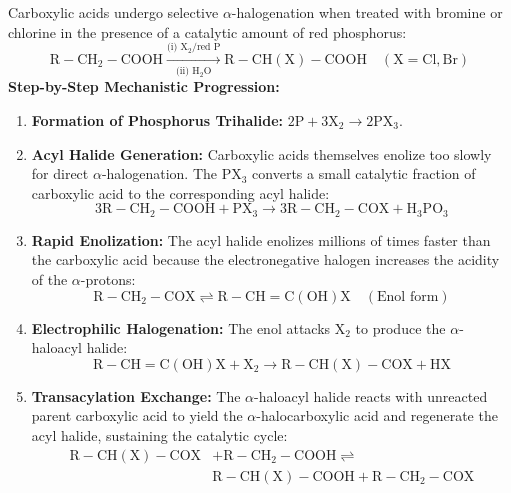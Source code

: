 \documentclass[10pt,twoside,openright]{book}
\begin{document}
\begin{conceptbox}
Carboxylic acids undergo selective $\alpha$-halogenation when treated with bromine or chlorine in the presence of a catalytic amount of red phosphorus:
\begin{equation}
  \mathrm{R-CH_2-COOH} \xrightarrow[\text{(ii) } \mathrm{H_2O}]{\text{(i) } \mathrm{X_2} / \text{red P}} \mathrm{R-CH(X)-COOH} \quad (\mathrm{X = Cl, Br})
\end{equation}
\textbf{Step-by-Step Mechanistic Progression:}
\begin{enumerate}[leftmargin=*]
  \item \textbf{Formation of Phosphorus Trihalide:} $2\mathrm{P} + 3\mathrm{X_2} \to 2\mathrm{PX_3}$.
  \item \textbf{Acyl Halide Generation:} Carboxylic acids themselves enolize too slowly for direct $\alpha$-halogenation. The $\mathrm{PX_3}$ converts a small catalytic fraction of carboxylic acid to the corresponding acyl halide:
  \begin{equation}
    3\mathrm{R-CH_2-COOH} + \mathrm{PX_3} \to 3\mathrm{R-CH_2-COX} + \mathrm{H_3PO_3}
  \end{equation}
  \item \textbf{Rapid Enolization:} The acyl halide enolizes millions of times faster than the carboxylic acid because the electronegative halogen increases the acidity of the $\alpha$-protons:
  \begin{equation}
    \mathrm{R-CH_2-COX} \rightleftharpoons \mathrm{R-CH=C(OH)X} \quad (\text{Enol form})
  \end{equation}
  \item \textbf{Electrophilic Halogenation:} The enol attacks $\mathrm{X_2}$ to produce the $\alpha$-haloacyl halide:
  \begin{equation}
    \mathrm{R-CH=C(OH)X} + \mathrm{X_2} \to \mathrm{R-CH(X)-COX} + \mathrm{HX}
  \end{equation}
  \item \textbf{Transacylation Exchange:} The $\alpha$-haloacyl halide reacts with unreacted parent carboxylic acid to yield the $\alpha$-halocarboxylic acid and regenerate the acyl halide, sustaining the catalytic cycle:
  \begin{align}
    \mathrm{R-CH(X)-COX} &+ \mathrm{R-CH_2-COOH} \rightleftharpoons \\
    &\mathrm{R-CH(X)-COOH} + \mathrm{R-CH_2-COX}
  \end{align}
\end{enumerate}
\end{conceptbox}
\end{document}
